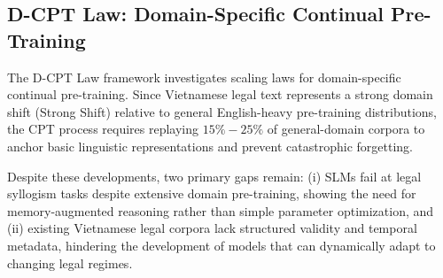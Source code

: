 \subsection{D-CPT Law: Domain-Specific Continual Pre-Training}
The D-CPT Law framework \parencite{que2024dcptlawdomainspecificcontinual} investigates scaling laws for domain-specific continual pre-training. Since Vietnamese legal text represents a strong domain shift (Strong Shift) relative to general English-heavy pre-training distributions, the CPT process requires replaying $15\% - 25\%$ of general-domain corpora to anchor basic linguistic representations and prevent catastrophic forgetting.

Despite these developments, two primary gaps remain: (i) SLMs fail at legal syllogism tasks despite extensive domain pre-training, showing the need for memory-augmented reasoning rather than simple parameter optimization, and (ii) existing Vietnamese legal corpora lack structured validity and temporal metadata, hindering the development of models that can dynamically adapt to changing legal regimes.
